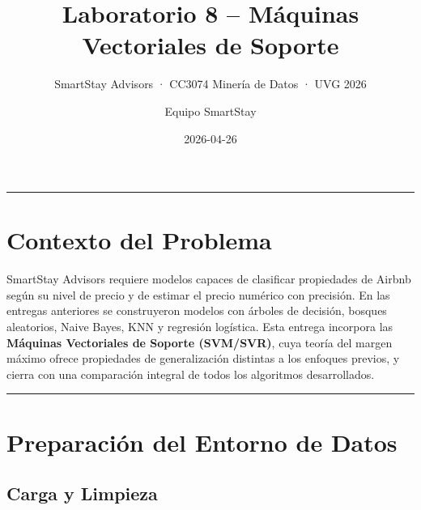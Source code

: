 \documentclass[
]{article}
\title{Laboratorio 8 -- Máquinas Vectoriales de Soporte}
\subtitle{SmartStay Advisors · CC3074 Minería de Datos · UVG 2026}
\author{Equipo SmartStay}
\date{2026-04-26}
\begin{document}
\maketitle

{
\setcounter{tocdepth}{2}
\tableofcontents
}
\begin{center}\rule{0.5\linewidth}{0.5pt}\end{center}

\section{Contexto del Problema}\label{contexto-del-problema}

SmartStay Advisors requiere modelos capaces de clasificar propiedades de
Airbnb según su nivel de precio y de estimar el precio numérico con
precisión. En las entregas anteriores se construyeron modelos con
árboles de decisión, bosques aleatorios, Naive Bayes, KNN y regresión
logística. Esta entrega incorpora las \textbf{Máquinas Vectoriales de
Soporte (SVM/SVR)}, cuya teoría del margen máximo ofrece propiedades de
generalización distintas a los enfoques previos, y cierra con una
comparación integral de todos los algoritmos desarrollados.

\begin{center}\rule{0.5\linewidth}{0.5pt}\end{center}

\section{Preparación del Entorno de
Datos}\label{preparaciuxf3n-del-entorno-de-datos}

\subsection{Carga y Limpieza}\label{carga-y-limpieza}
\end{document}

